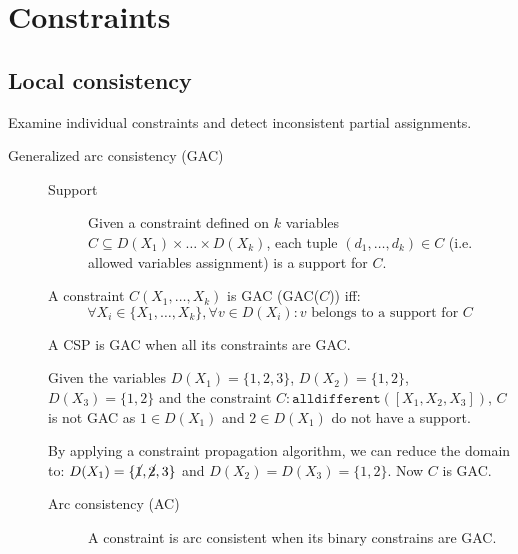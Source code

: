 \section{Constraints}


\subsection{Local consistency}

Examine individual constraints and detect inconsistent partial assignments.

\begin{description}
    \item[Generalized arc consistency (GAC)] 
        \phantom{}
        \begin{description}
            \item[Support]
                Given a constraint defined on $k$ variables $C \subseteq D(X_1)\times \dots \times D(X_k)$,
                each tuple $(d_1, \dots, d_k) \in C$ (i.e. allowed variables assignment) is a support for $C$.
        \end{description}

        A constraint $C(X_1, \dots, X_k)$ is GAC (GAC($C$)) iff:
        \[ \forall X_i \in \{ X_1, \dots, X_k \}, \forall v \in D(X_i): \text{$v$ belongs to a support for $C$} \]

        \begin{remark}
            A CSP is GAC when all its constraints are GAC.
        \end{remark}

        \begin{example}
            Given the variables $D(X_1) = \{ 1, 2, 3 \}$, $D(X_2) = \{ 1, 2 \}$, $D(X_3) = \{ 1, 2 \}$ and 
            the constraint $C: \texttt{alldifferent}([X_1, X_2, X_3])$,
            $C$ is not GAC as $1 \in D(X_1)$ and $2 \in D(X_1)$ do not have a support.
            
            By applying a constraint propagation algorithm, we can reduce the domain to: 
            $D(X_1) = \{ \cancel{1}, \cancel{2}, 3 \}$ and $D(X_2) = D(X_3) = \{ 1, 2 \}$.
            Now $C$ is GAC.
        \end{example}

        \begin{description}
            \item[Arc consistency (AC)] 
                A constraint is arc consistent when its binary constrains are GAC.


\end{description}
\end{description}
